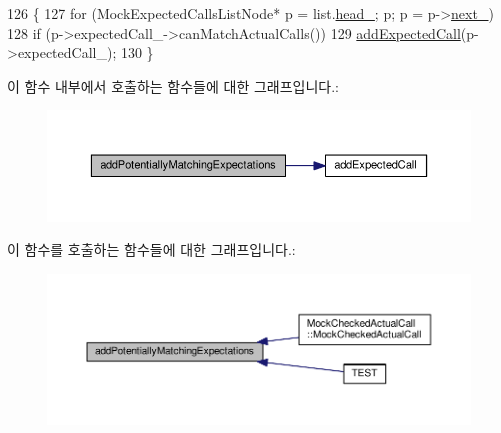 \begin{DoxyCode}
126 \{
127     \textcolor{keywordflow}{for} (MockExpectedCallsListNode* p = list.\hyperlink{class_mock_expected_calls_list_a18290c3c0a206882dd8e0d9f446e2fe6}{head\_}; p; p = p->\hyperlink{class_mock_expected_calls_list_1_1_mock_expected_calls_list_node_aaae452a372ae14c06a6d5d252df73725}{next\_})
128         \textcolor{keywordflow}{if} (p->expectedCall\_->canMatchActualCalls())
129             \hyperlink{class_mock_expected_calls_list_a93aa2234c01260b1e76ceef59f8cfaee}{addExpectedCall}(p->expectedCall\_);
130 \}
\end{DoxyCode}


이 함수 내부에서 호출하는 함수들에 대한 그래프입니다.\+:
\nopagebreak
\begin{figure}[H]
\begin{center}
\leavevmode
\includegraphics[width=350pt]{class_mock_expected_calls_list_acc0ff899b5ca2a40e906b2966e9e340f_cgraph}
\end{center}
\end{figure}




이 함수를 호출하는 함수들에 대한 그래프입니다.\+:
\nopagebreak
\begin{figure}[H]
\begin{center}
\leavevmode
\includegraphics[width=350pt]{class_mock_expected_calls_list_acc0ff899b5ca2a40e906b2966e9e340f_icgraph}
\end{center}
\end{figure}


